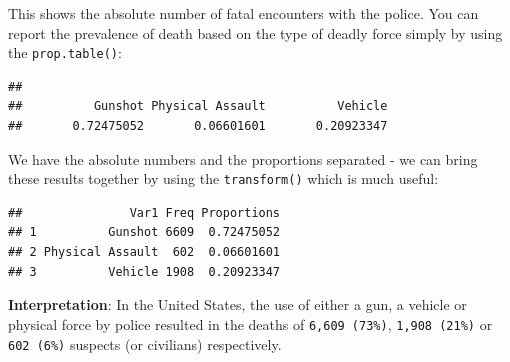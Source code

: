 \documentclass[
]{book}
\newenvironment{Shaded}{\begin{snugshade}}{\end{snugshade}}
\newcommand{\AttributeTok}[1]{\textcolor[rgb]{0.77,0.63,0.00}{#1}}
\newcommand{\CommentTok}[1]{\textcolor[rgb]{0.56,0.35,0.01}{\textit{#1}}}
\newcommand{\FunctionTok}[1]{\textcolor[rgb]{0.00,0.00,0.00}{#1}}
\newcommand{\NormalTok}[1]{#1}
\newcommand{\OtherTok}[1]{\textcolor[rgb]{0.56,0.35,0.01}{#1}}
\newcommand{\SpecialCharTok}[1]{\textcolor[rgb]{0.00,0.00,0.00}{#1}}
\begin{document}
This shows the absolute number of fatal encounters with the police. You can report the prevalence of death based on the type of deadly force simply by using the \texttt{prop.table()}:

\begin{Shaded}
\end{Shaded}

\begin{verbatim}
## 
##          Gunshot Physical Assault          Vehicle 
##       0.72475052       0.06601601       0.20923347
\end{verbatim}

We have the absolute numbers and the proportions separated - we can bring these results together by using the \texttt{transform()} which is much useful:

\begin{Shaded}
\end{Shaded}

\begin{verbatim}
##               Var1 Freq Proportions
## 1          Gunshot 6609  0.72475052
## 2 Physical Assault  602  0.06601601
## 3          Vehicle 1908  0.20923347
\end{verbatim}

\textbf{Interpretation}: In the United States, the use of either a gun, a vehicle or physical force by police resulted in the deaths of \texttt{6,609\ (73\%)}, \texttt{1,908\ (21\%)} or \texttt{602\ (6\%)} suspects (or civilians) respectively.
\end{document}
